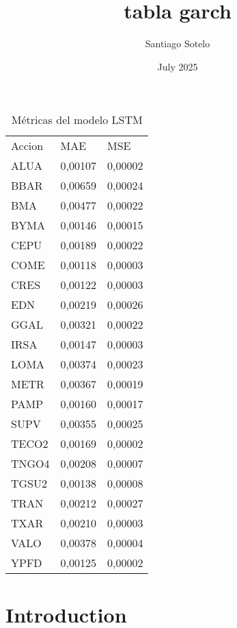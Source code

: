 \documentclass{article}
\title{tabla garch}
\author{Santiago Sotelo}
\date{July 2025}
\begin{document}
\begin{table}[]
\centering
\caption{Métricas del modelo LSTM}
\label{tab:my-table}
\begin{tabular}{lll}
Accion & MAE     & MSE     \\
ALUA   & 0,00107 & 0,00002 \\
BBAR   & 0,00659 & 0,00024 \\
BMA    & 0,00477 & 0,00022 \\
BYMA   & 0,00146 & 0,00015 \\
CEPU   & 0,00189 & 0,00022 \\
COME   & 0,00118 & 0,00003 \\
CRES   & 0,00122 & 0,00003 \\
EDN    & 0,00219 & 0,00026 \\
GGAL   & 0,00321 & 0,00022 \\
IRSA   & 0,00147 & 0,00003 \\
LOMA   & 0,00374 & 0,00023 \\
METR   & 0,00367 & 0,00019 \\
PAMP   & 0,00160 & 0,00017 \\
SUPV   & 0,00355 & 0,00025 \\
TECO2  & 0,00169 & 0,00002 \\
TNGO4  & 0,00208 & 0,00007 \\
TGSU2  & 0,00138 & 0,00008 \\
TRAN   & 0,00212 & 0,00027 \\
TXAR   & 0,00210 & 0,00003 \\
VALO   & 0,00378 & 0,00004 \\
YPFD   & 0,00125 & 0,00002
\end{tabular}
\end{table}

\section{Introduction}
\end{document}
